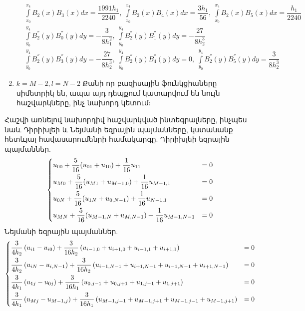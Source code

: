 \documentclass[fleqn, bachelor,subf,12pt,notitlepage]{article}
\begin{document}
\begin{enumerate}
\begin{equation}
\begin{aligned}
&\int \limits_{x_{0}}^{x_{4}}B_{2}(x)B_{3}(x)dx=\dfrac{1991h_{1}}{2240}, \; \int \limits_{x_{0}}^{x_{4}}B_{2}(x)B_{4}(x)dx=\dfrac{3h_{1}}{56}, \; \int \limits_{x_{0}}^{x_{4}}B_{2}(x)B_{5}(x)dx=\dfrac{h_{1}}{2240} \\
&\int \limits_{y_{0}}^{y_{4}}B_{2}^{''}(y)B_{0}^{''}(y)dy = -\dfrac{3}{8h_{1}^{2}}, \; \int \limits_{y_{0}}^{y_{4}}B_{2}^{''}(y)B_{1}^{''}(y)dy = -\dfrac{27}{8h_{2}^3} \\
&\int \limits_{y_{0}}^{y_{4}}B_{2}^{''}(y)B_{3}^{''}(y)dy =-\dfrac{27}{8h_{2}^3}, \; \int \limits_{y_{0}}^{y_{4}}B_{2}^{''}(y)B_{4}^{''}(y)dy = 0, \; \int \limits_{y_{0}}^{y_{4}}B_{2}^{''}(y)B_{5}^{''}(y)dy =  \dfrac{3}{8h_{2}^3}
\end{aligned}
\end{equation}
\item{$k=M-2, l=N-2$}
Քանի որ բազիսային ֆունկցիաները սիմետրիկ են, ապա այդ դեպքում կատարվում են նույն հաշվարկները, ինչ նախորդ կետում։
\end{enumerate}
Հաշվի առնելով նախորդիվ հաշվարկված ինտեգրալները, ինչպես նաև Դիրիխլեի և Նեյմանի եզրային պայմանները, կստանանք հետևյալ հավասարումենրի համակարգը.
Դիրիխլեի եզրային պայմաններ.
\begin{equation}
\begin{dcases}
u_{00}+\frac{5}{16}(u_{01} + u_{10}) +\frac{1}{16}u_{11} &= 0\\
u_{M0}+\frac{5}{16}(u_{M1} + u_{M-1,0}) +\frac{1}{16}u_{M-1, 1} &= 0\\
u_{0N}+\frac{5}{16}(u_{1N} + u_{0,N-1}) +\frac{1}{16}u_{N-1, 1} &= 0\\
u_{MN}+\frac{5}{16}(u_{M-1,N} + u_{M,N-1}) +\frac{1}{16}u_{M-1,N-1} &= 0
\end{dcases}
\end{equation}
Նեյմանի եզրային պայմաններ.
\begin{equation}
\begin{dcases}
\dfrac{3}{4h_{2}}\left(u_{i1} - u_{i0}\right) + \dfrac{3}{16h_{2}}\left(u_{i-1, 0}+u_{i+1, 0}+u_{i-1, 1}+u_{i+1, 1}\right)&=0\\
\dfrac{3}{4h_{2}}\left(u_{iN} - u_{i, N-1}\right) + \dfrac{3}{16h_{2}}\left(u_{i-1, N-1}+u_{i+1, N-1}+u_{i-1, N-1}+u_{i+1, N-1}\right)&=0\\
\dfrac{3}{4h_{1}}\left(u_{1j} - u_{0j}\right) + \dfrac{3}{16h_{1}}\left(u_{0, j-1}+u_{0, j+1}+u_{1, j-1}+u_{1, j+1}\right)&=0\\
\dfrac{3}{4h_{1}}\left(u_{Mj} - u_{M-1,j}\right) + \dfrac{3}{16h_{1}}\left(u_{M-1,j-1}+u_{M-1, j+1}+u_{M-1, j-1}+u_{M-1, j+1}\right)&=0\\
\end{dcases}
\end{equation}
\end{document}

